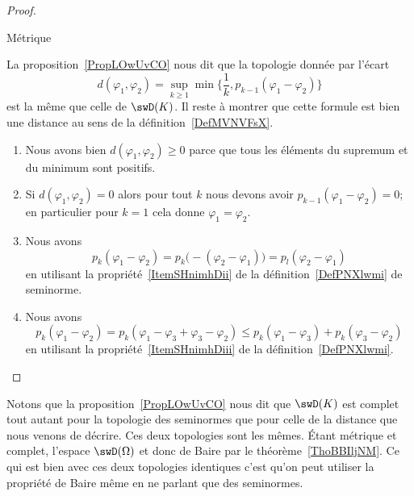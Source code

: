 \begin{proof}
\begin{subproof}
        \item[Métrique]

            La proposition~\ref{PropLOwUvCO} nous dit que la topologie donnée par l'écart
            \begin{equation}
                d(\varphi_1,\varphi_2)=\sup_{k\geq 1}\min\{ \frac{1}{ k },p_{k-1}(\varphi_1-\varphi_2) \}
            \end{equation}
            est la même que celle de \( \swD(K)\). Il reste à montrer que cette formule est bien une distance au sens de la définition~\ref{DefMVNVFsX}.
            \begin{enumerate}
                \item
                    Nous avons bien \( d(\varphi_1,\varphi_2)\geq 0\) parce que tous les éléments du supremum et du minimum sont positifs.
                \item
                    Si \( d(\varphi_1,\varphi_2)=0\) alors pour tout \( k\) nous devons avoir \( p_{k-1}(\varphi_1-\varphi_2)=0\); en particulier pour \( k=1\) cela donne \( \varphi_1=\varphi_2\).
                \item
                    Nous avons
                    \begin{equation}
                        p_k(\varphi_1-\varphi_2)=p_k\big( -(\varphi_2-\varphi_1) \big)=p_l(\varphi_2-\varphi_1)
                    \end{equation}
                    en utilisant la propriété~\ref{ItemSHnimhDii} de la définition~\ref{DefPNXlwmi} de seminorme.
                \item
                    Nous avons
                    \begin{equation}
                        p_k(\varphi_1-\varphi_2)=p_k(\varphi_1-\varphi_3+\varphi_3-\varphi_2)\leq p_k(\varphi_1-\varphi_3)+p_k(\varphi_3-\varphi_2)
                    \end{equation}
                    en utilisant la propriété~\ref{ItemSHnimhDiii} de la définition~\ref{DefPNXlwmi}.
            \end{enumerate}
        \end{subproof}
\end{proof}
Notons que la proposition~\ref{PropLOwUvCO} nous dit que \( \swD(K)\) est complet tout autant pour la topologie des seminormes que pour celle de la distance que nous venons de décrire. Ces deux topologies sont les mêmes. Étant métrique et complet, l'espace \( \swD(\Omega)\) et donc de Baire par le théorème~\ref{ThoBBIljNM}. Ce qui est bien avec ces deux topologies identiques c'est qu'on peut utiliser la propriété de Baire même en ne parlant que des seminormes.

